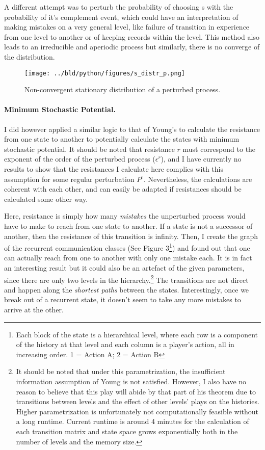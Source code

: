 \documentclass[11pt, a4paper, leqno]{article}
\begin{document}
A different attempt was to perturb the probability of choosing s with the probability of it's complement event, which could have an interpretation of making mistakes on a very general level, like failure of transition in experience from one level to another or of keeping records within the level. This method also leads to an irreducible and aperiodic process but similarly, there is no converge of the distribution.

\begin{figure}
    \centering
    \texttt{[image: ../bld/python/figures/s\_distr\_p.png]}
    \caption{Non-convergent stationary distribution of a perturbed process.}
\end{figure}

\paragraph{Minimum Stochastic Potential.}

I did however applied a similar logic to that of Young's to calculate the resistance from one state to another to potentially calculate the states with minimum stochastic potential. It should be noted that resistance $r$ must correspond to the exponent of the order of the perturbed process ($\epsilon^r$), and I have currently no results to show that the resistances I calculate here complies with this assumption for some regular perturbation $P^\epsilon$. Nevertheless, the calculations are coherent with each other, and can easily be adapted if resistances should be calculated some other way.

Here, resistance is simply how many \textit{mistakes} the unperturbed process would have to make to reach from one state to another. If a state is not a successor of another, then the resistance of this transition is infinity. Then, I create the graph of the recurrent communication classes (See Figure 3\footnote{Each block of the state is a hierarchical level, where each row is a component of the history at that level and each column is a player's action, all in increasing order. 1 = Action A; 2 = Action B}) and found out that one can actually reach from one to another with only one mistake each. It is in fact an interesting result but it could also be an artefact of the given parameters, since there are only two levels in the hierarchy.\footnote{It should be noted that under this parametrization, the insufficient information assumption of Young is not satisfied. However, I also have no reason to believe that this play will abide by that part of his theorem due to transitions between levels and the effect of other levels' plays on the histories. Higher parametrization is unfortunately not computationally feasible without a long runtime. Current runtime is around 4 minutes for the calculation of each transition matrix and state space grows exponentially both in the number of levels and the memory size.} The transitions are not direct and happen along the \textit{shortest paths} between the states. Interestingly, once we break out of a recurrent state, it doesn't seem to take any more mistakes to arrive at the other. 
\end{document}
